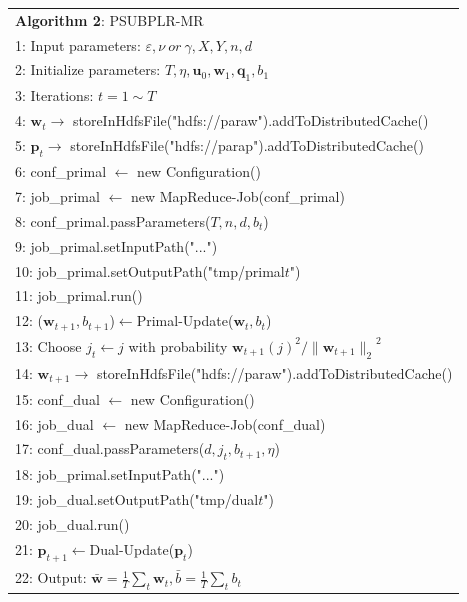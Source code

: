 \documentclass[10pt, conference, compsocconf]{IEEEtran}
\newcommand{\bw}{\mathbf{w}}
\newcommand{\bp}{\mathbf{p}}
\newcommand{\bq}{\mathbf{q}}
\newcommand{\lc}{\left(}
\newcommand{\rc}{\right)}
\newcommand{\lj}{\lc j\rc}
\newcommand{\tspace}{\hspace*{2em}}
\newcommand{\tspaces}{\hspace*{1.5em}}
\begin{document}
	\begin{table}[ht]
	\begin{tabular}{l}
	\hline\noalign{\smallskip}
	\textbf{Algorithm 2}: PSUBPLR-MR \\
	\noalign{\smallskip}
	\hline
	\noalign{\smallskip}
    1:  Input parameters: $\varepsilon, \nu~or~\gamma, X, Y, n, d$ \\
    2:	Initialize parameters: $T, \eta, {\mathbf{u}}_{0}, {\bw}_{1}, {\mathbf{\bq}}_{1}, {b}_{1}$\\
    3:	Iterations: $t=1 \sim T$ \\
    4:  \tspace $\bw_t \rightarrow$ storeInHdfsFile("hdfs://paraw").addToDistributedCache() \\
    5:  \tspace $\bp_t \rightarrow$ storeInHdfsFile("hdfs://parap").addToDistributedCache() \\
    6:  \tspace conf\_primal $\leftarrow$ new Configuration() \\
    7:  \tspace job\_primal $\leftarrow$ new MapReduce-Job(conf\_primal) \\
    8:  \tspace conf\_primal.passParameters($T, n, d, b_t$) \\
    9:  \tspace job\_primal.setInputPath("...") \\
	10:	\tspaces job\_primal.setOutputPath("tmp/primal$t$") \\
    11: \tspaces job\_primal.run() \\
    12: \tspaces ($\bw_{t+1}, b_{t+1}$)$\leftarrow$Primal-Update($\bw_t, b_t$) \\
    13: \tspaces Choose $j_t \leftarrow j$ with probability ${{\bw}_{t+1}\lj}^{2}/{\|{\bw}_{t+1}\|_2}^{2} $ \\
    14: \tspaces $\bw_{t+1} \rightarrow$ storeInHdfsFile("hdfs://paraw").addToDistributedCache() \\
    15: \tspaces conf\_dual $\leftarrow$ new Configuration() \\
    16: \tspaces job\_dual $\leftarrow$ new MapReduce-Job(conf\_dual) \\
    17: \tspaces conf\_dual.passParameters($d, j_t, b_{t+1}, \eta$) \\
    18: \tspaces job\_primal.setInputPath("...") \\	
    19:	\tspaces job\_dual.setOutputPath("tmp/dual$t$") \\
    20: \tspaces job\_dual.run() \\	
    21: \tspaces $\bp_{t+1}\leftarrow$Dual-Update($\bp_t$) \\
    22: Output: $\bar{\bw}=\frac{1}{T}\sum_{t}{\bw}_{t},\bar{b}=\frac{1}{T}\sum_{t}{b}_{t}$ \\
	\hline
	\end{tabular}
	\end{table}
\end{document}
